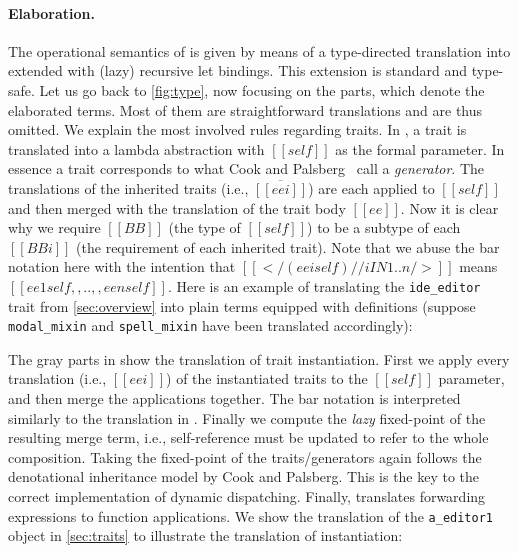\paragraph{Elaboration.}

The operational semantics of \sedel is given by means of a type-directed
translation into \fname extended with (lazy) recursive let bindings.
This extension is standard and type-safe. Let us go back to
\cref{fig:type}, now focusing on the  parts, which
denote the elaborated \fname terms. Most of them
are straightforward translations and are thus omitted. We explain the most
involved rules regarding traits. In , a trait is translated into
a lambda abstraction with $[[self]]$ as the formal parameter.
In essence a trait corresponds to what Cook and Palsberg~\cite{cook1989denotational} call a \emph{generator}.
 The translations
of the inherited traits (i.e., $\overline{[[eei]]}$) are each applied to
$[[self]]$ and then merged with the translation of the trait body $[[ee]]$. Now
it is clear why we require $[[BB]]$ (the type of $[[self]]$) to be a subtype of each
$[[BBi]]$ (the requirement of each inherited trait). Note that we abuse the bar
notation here with the intention that $[[</ (eei self) // i IN 1..n />]]$ means
$[[ee1 self ,, .. ,, een self]]$.
Here is an example of translating the \lstinline{ide_editor} trait from \cref{sec:overview} into
plain \fname terms equipped with definitions (suppose \lstinline{modal_mixin} and \lstinline{spell_mixin}
have been translated accordingly):

The gray parts in  show the translation of trait instantiation.
First we apply every translation (i.e., $[[eei]]$) of the instantiated traits to the $[[self]]$ parameter,
and then merge the applications together. The bar notation is
interpreted similarly to the translation in . Finally we compute the \emph{lazy}
fixed-point of the resulting merge term, i.e., self-reference must be updated to refer to
the whole composition. Taking the fixed-point of the
traits/generators again follows the denotational inheritance model by
Cook and Palsberg.
 This is the key to the correct implementation of dynamic
 dispatching. Finally,
 translates forwarding expressions to function
applications. We show the translation of the
\lstinline{a_editor1} object in \cref{sec:traits} to illustrate the
translation of instantiation:

